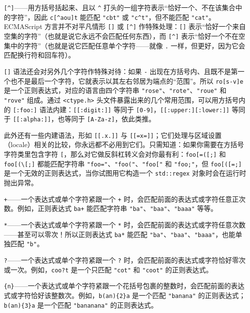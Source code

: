 \texttt{[{\textasciicircum{}}]}——用方括号括起来、且以 \texttt{\textasciicircum{}} 打头的一组字符表示“恰好一个、不在该集合中的字符”，因此 \texttt{c[{\textasciicircum{}}aou]t} 能匹配 \texttt{"cbt"} 或 \texttt{"c\textasciicircum{}t"}，但不能匹配 \texttt{"cat"}。ECMAScript 方言并不对平凡情形 \texttt{[]} 或 \texttt{[{\textasciicircum{}}]} 作特殊处理：\texttt{[]} 表示“恰好一个来自空集的字符”（也就是说它永远不会匹配任何东西），而 \texttt{[{\textasciicircum{}}]} 表示“恰好一个不在空集中的字符”（也就是说它匹配任意单个字符——就像 \texttt{.} 一样，但更好，因为它会匹配换行符和回车符）。

\texttt{[]} 语法还会对另外几个字符作特殊对待：如果 \texttt{-} 出现在方括号内、且既不是第一个也不是最后一个字符，它就表示以其左右邻居为端点的“范围”。所以 \texttt{ro[s-v]e} 是一个正则表达式，对应的语言由四个字符串 \texttt{"rose"}、\texttt{"rote"}、\texttt{"roue"} 和 \texttt{"rove"} 组成。通过 \texttt{<ctype.\allowbreak{}h>\allowbreak{}} 头文件暴露出来的几个常用范围，可以用方括号内的 \texttt{[:foo:]} 语法内建：\texttt{[[:digit:]]} 等同于 \texttt{[0-9]}，\texttt{[[:upper:][:lower:]]} 等同于 \texttt{[[:alpha:]]}，也等同于 \texttt{[A-Za-z]}，依此类推。

此外还有一些内建语法，形如 \texttt{[[.x.]]} 与 \texttt{[[=x=]]}；它们处理与区域设置（locale）相关的比较，你永远都不必用到它们。只需知道：如果你需要在方括号字符类里包含字符 \texttt{[}，那么对它做反斜杠转义会对你最有利：\texttt{foo[=(\allowbreak{}[;]} 和 \texttt{foo[(\textbackslash{}[;]} 都能匹配字符串 \texttt{"foo="}、\texttt{"foo(\allowbreak{}"}、\texttt{"foo["} 和 \texttt{"foo;"}，但 \texttt{foo[(\allowbreak{}[=;]} 是一个无效的正则表达式，当你试图用它构造一个 \texttt{std::\allowbreak{}regex} 对象时会在运行时抛出异常。

\texttt{+}——一个表达式或单个字符紧跟一个 \texttt{+} 时，会匹配前面的表达式或字符任意正次数。例如，正则表达式 \texttt{ba+} 能匹配字符串 \texttt{"ba"}、\texttt{"baa"}、\texttt{"baaa"} 等等。

\texttt{*}——一个表达式或单个字符紧跟一个 \texttt{*} 时，会匹配前面的表达式或字符任意次数——甚至可以零次！所以正则表达式 \texttt{ba*} 能匹配 \texttt{"ba"}、\texttt{"baa"}、\texttt{"baaa"}，也能单独匹配 \texttt{"b"}。

\texttt{?}——一个表达式或单个字符紧跟一个 \texttt{?} 时，会匹配前面的表达式或字符恰好零次或一次。例如，\texttt{coo?t} 是一个只匹配 \texttt{"cot"} 和 \texttt{"coot"} 的正则表达式。

\texttt{\{n\}}——一个表达式或单个字符紧跟一个花括号包裹的整数时，会匹配前面的表达式或字符恰好该整数次。例如，\texttt{b(\allowbreak{}an)\allowbreak{}\{2\}a} 是一个匹配 \texttt{"banana"} 的正则表达式；\texttt{b(\allowbreak{}an)\allowbreak{}\{3\}a} 是一个匹配 \texttt{"bananana"} 的正则表达式。

